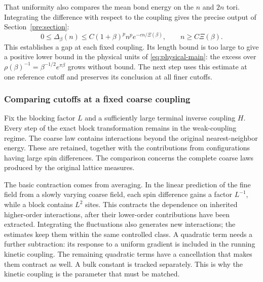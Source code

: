 That uniformity also compares the mean bond energy on the $n$ and
$2n$ tori. Integrating the difference with respect to the coupling
gives the precise output of Section~\ref{pre:section}:
\begin{equation}
 0\le\Delta_\beta(n)
 \le C(1+\beta)^p n^p e^{-cn/\Xi(\beta)},
 \qquad n\ge C\Xi(\beta).
 \label{intro:preliminary}
\end{equation}
This establishes a gap at each fixed coupling. Its length bound is too
large to give a positive lower bound in the physical units of
\eqref{eq:physical-main}: the excess over
$\rho(\beta)^{-1}=\beta^{-1/2}e^{\pi\beta}$ grows without bound.
The next step uses this estimate at one reference cutoff and preserves
its conclusion at all finer cutoffs.

\subsubsection{Comparing cutoffs at a fixed coarse coupling}

Fix the blocking factor $L$ and a sufficiently large terminal inverse
coupling $H$. Every step of the exact block transformation remains in
the weak-coupling regime. The coarse law contains interactions beyond
the original nearest-neighbor energy. These are retained, together
with the contributions from configurations having large spin
differences. The comparison concerns the complete coarse laws
produced by the original lattice measures.

The basic contraction comes from averaging. In the linear prediction
of the fine field from a slowly varying coarse field, each spin
difference gains a factor $L^{-1}$, while a block contains $L^2$ sites.
This contracts the dependence on inherited higher-order interactions,
after their lower-order contributions have been extracted. Integrating
the fluctuations also generates new interactions; the estimates keep
them within the same controlled class. A quadratic
term needs a further subtraction: its response to a uniform gradient
is included in the running kinetic coupling. The remaining quadratic
terms have a cancellation that makes them contract as well. A bulk
constant is tracked separately. This is why the kinetic coupling is
the parameter that must be matched.

